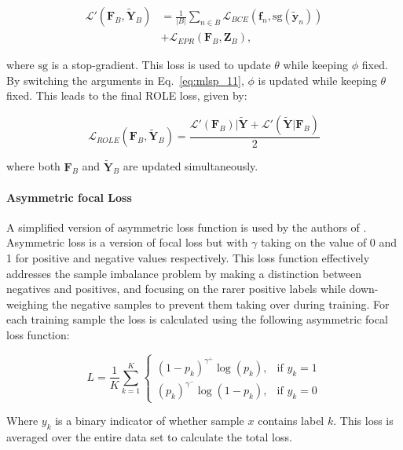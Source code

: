 \documentclass[lettersize,journal]{IEEEtran}
\begin{document}
\begin{equation}
    \label{eq:mlsp_11}
    \begin{aligned}
        \mathcal{L}'(\mathbf{F}_B,\tilde{\mathbf{Y}}_B) &= \frac{1}{|B|}\sum_{n\in B} \mathcal{L}_{BCE}(\mathbf{f}_n,\text{sg}(\tilde{\mathbf{y}}_n)) \\
        &+ \mathcal{L}_{EPR}(\mathbf{F}_B,\mathbf{Z}_B)\text{,}
    \end{aligned}
\end{equation}

\noindent where $\text{sg}$ is a stop-gradient. This loss is used to update $\theta$ while keeping $\phi$ fixed. By switching the arguments in Eq.~\ref{eq:mlsp_11}, $\phi$ is updated while keeping $\theta$ fixed. This leads to the final ROLE loss, given by:

\begin{equation}
    \mathcal{L}_{ROLE}(\mathbf{F}_B, \mathbf{\tilde{Y}}_B) = \frac{\mathcal{L}'(\mathbf{F}_B)|\mathbf{\tilde{Y}}+\mathcal{L}'(\mathbf{\tilde{Y}}|\mathbf{F}_B)}{2}
\end{equation}

\noindent where both $\mathbf{F}_B$ and $\tilde{\mathbf{Y}}_B$ are updated simultaneously.

\paragraph{Asymmetric focal Loss}
\label{sec:afl}
A simplified version of asymmetric loss function is used by the authors of \cite{Query2Label}. Asymmetric loss is a version of focal loss but with $\gamma$ taking on the value of 0 and 1 for positive and negative values respectively. This loss function effectively addresses the sample imbalance problem by making a distinction between negatives and positives, and focusing on the rarer positive labels while down-weighing the negative samples to prevent them taking over during training. For each training sample the loss is calculated using the following asymmetric focal loss function:

\begin{equation}
    L = \frac{1}{K} \sum_{k=1}^{K}
\begin{cases}
(1 - p_k)^{\gamma^+} \log(p_k), & \text{if } y_k = 1 \\
(p_k)^{\gamma^-} \log(1 - p_k), & \text{if } y_k = 0
\end{cases}
\end{equation}

Where $y_k$ is a binary indicator of whether sample $x$ contains label $k$. This loss is averaged over the entire data set to calculate the total loss. 
\end{document}
